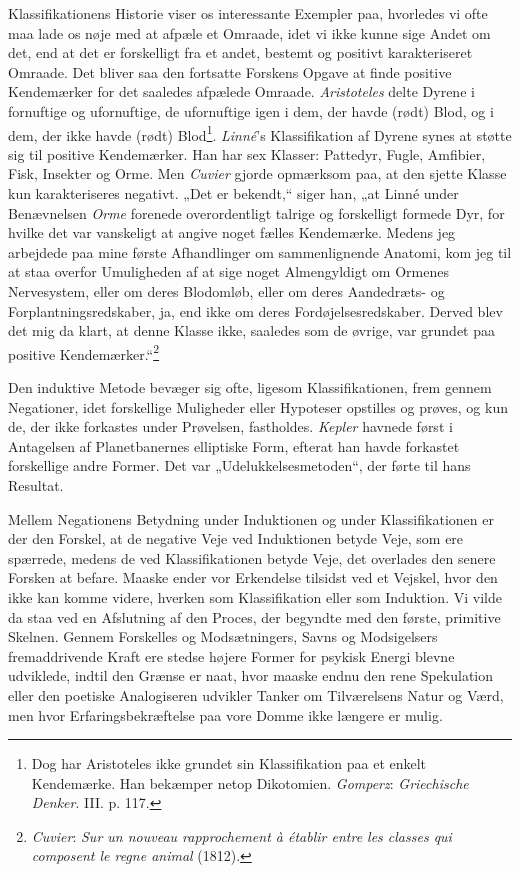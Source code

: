 \documentclass[12pt,a4paper]{book}
\newcommand{\apage}[1]{\marginnote{\footnotesize\textit{[#1]}}}
\begin{document}
Klassifikationens Historie viser os interessante Exempler paa, hvorledes
vi ofte maa lade os nøje med at afpæle et Omraade, idet vi ikke kunne
sige Andet om det, end at det er forskelligt fra et andet, bestemt og
positivt karakteriseret \apage{81} Omraade. Det bliver saa den fortsatte Forskens
Opgave at finde positive Kendemærker for det saaledes afpælede Omraade.
\emph{Aristoteles} delte Dyrene i fornuftige og ufornuftige, de
ufornuftige igen i dem, der havde (rødt) Blod, og i dem, der ikke havde
(rødt) Blod\footnote{Dog har Aristoteles ikke grundet sin Klassifikation
paa et enkelt Kendemærke. Han bekæmper netop Dikotomien. \emph{Gomperz}:
\emph{Griechische Denker}. III. p. 117.}. \emph{Linné}’s Klassifikation
af Dyrene synes at støtte sig til positive Kendemærker. Han har sex
Klasser: Pattedyr, Fugle, Amfibier, Fisk, Insekter og Orme. Men
\emph{Cuvier} gjorde opmærksom paa, at den sjette Klasse kun
karakteriseres negativt. „Det er bekendt,“ siger han, „at Linné under
Benævnelsen \emph{Orme} forenede overordentligt talrige og forskelligt
formede Dyr, for hvilke det var vanskeligt at angive noget fælles
Kendemærke. Medens jeg arbejdede paa mine første Afhandlinger om
sammenlignende Anatomi, kom jeg til at staa overfor Umuligheden af at
sige noget Almengyldigt om Ormenes Nervesystem, eller om deres
Blodomløb, eller om deres Aandedræts- og Forplantningsredskaber, ja, end
ikke om deres Fordøjelsesredskaber. Derved blev det mig da klart, at
denne Klasse ikke, saaledes som de øvrige, var grundet paa positive
Kendemærker.“\footnote{\emph{Cuvier}: \emph{Sur un nouveau rapprochement
à établir entre les classes qui composent le regne animal} (1812).}

Den induktive Metode bevæger sig ofte, ligesom Klassifikationen, frem
gennem Negationer, idet forskellige Muligheder eller Hypoteser opstilles
og prøves, og kun de, der ikke forkastes under Prøvelsen, fastholdes.
\emph{Kepler} havnede først i Antagelsen af Planetbanernes elliptiske
Form, efterat han havde forkastet forskellige andre Former. Det var
„Udelukkelsesmetoden“, der førte til hans Resultat.

Mellem Negationens Betydning under Induktionen og under Klassifikationen
er der den Forskel, at de negative Veje ved Induktionen betyde Veje, som
ere spærrede, medens de ved Klassifikationen betyde Veje, det overlades
den senere Forsken at befare. Maaske ender vor Erkendelse tilsidst ved
et Vejskel, hvor den ikke kan komme videre, hverken som Klassifikation
eller som Induktion. Vi vilde da \apage{82} staa ved en Afslutning af den Proces,
der begyndte med den første, primitive Skelnen. Gennem Forskelles og
Modsætningers, Savns og Modsigelsers fremaddrivende Kraft ere stedse
højere Former for psykisk Energi blevne udviklede, indtil den Grænse er
naat, hvor maaske endnu den rene Spekulation eller den poetiske
Analogiseren udvikler Tanker om Tilværelsens Natur og Værd, men hvor
Erfaringsbekræftelse paa vore Domme ikke længere er mulig.
\end{document}
